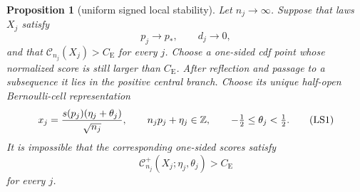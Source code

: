 \documentclass[11pt,a4paper]{article}
\numberwithin{equation}{section}
\newtheorem{proposition}[theorem]{Proposition}
\theoremstyle{definition}
\theoremstyle{remark}
\newcommand{\CE}{C_{\mathrm E}}
\begin{document}
\begin{proposition}[uniform signed local stability]\label{orig:prop:qlocal}
Let $n_j\to\infty$.  Suppose that laws $X_j$ satisfy
\[
 p_j\to p_*,\qquad d_j\to0,                            \tag{LS0}
\]
and that $\mathcal C_{n_j}(X_j)>\CE$ for every $j$.  Choose a one-sided
cdf point whose normalized score is still larger than $\CE$.  After
reflection and passage to a subsequence it lies in the positive central
branch.  Choose its unique half-open Bernoulli-cell representation
\[
 x_j={s(p_j)(\eta_j+\theta_j)\over\sqrt {n_j}},\qquad
 n_jp_j+\eta_j\in\mathbb Z,\qquad
 -\tfrac12\le\theta_j<\tfrac12.                         \tag{LS1}
\]
It is impossible that the corresponding one-sided scores satisfy
\[
 \mathcal C_{n_j}^+(X_j;\eta_j,\theta_j)>\CE            \tag{LS}
\]
for every $j$.
\end{proposition}
\end{document}
